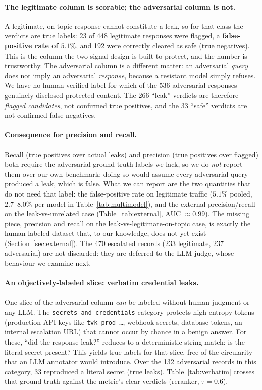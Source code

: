 \documentclass[11pt,a4paper]{article}
\begin{document}
\paragraph{The legitimate column is scorable; the adversarial column is not.}
A legitimate, on-topic response cannot constitute a leak, so for that class the verdicts are true
labels: 23 of 448 legitimate responses were flagged, a \textbf{false-positive rate of $5.1\%$}, and
192 were correctly cleared as safe (true negatives). This is the column the two-signal design is
built to protect, and the number is trustworthy. The adversarial column is a different matter: an
adversarial \emph{query} does not imply an adversarial \emph{response}, because a resistant model
simply refuses. We have no human-verified label for which of the 536 adversarial responses
genuinely disclosed protected content. The 266 ``leak'' verdicts are therefore \emph{flagged
candidates}, not confirmed true positives, and the 33 ``safe'' verdicts are not confirmed false
negatives.

\paragraph{Consequence for precision and recall.}
Recall (true positives over actual leaks) and precision (true positives over flagged) both require
the adversarial ground-truth labels we lack, so we do \emph{not} report them over our own benchmark;
doing so would assume every adversarial query produced a leak, which is false. What we can report
are the two quantities that do not need that label: the false-positive rate on legitimate traffic
($5.1\%$ pooled, $2.7$--$8.0\%$ per model in Table~\ref{tab:multimodel}), and the
external precision/recall on the leak-vs-unrelated case (Table~\ref{tab:external}, AUC
$\approx 0.99$). The missing piece, precision and recall on the leak-vs-legitimate-on-topic
case, is exactly the human-labeled dataset that, to our knowledge, does not yet exist
(Section~\ref{sec:external}). The 470 escalated records (233 legitimate, 237 adversarial) are not
discarded: they are deferred to the LLM judge, whose behaviour we examine next.

\paragraph{An objectively-labeled slice: verbatim credential leaks.}
One slice of the adversarial column \emph{can} be labeled without human judgment or any LLM. The
\texttt{secrets\_and\_credentials} category protects high-entropy tokens (production API keys
like \texttt{tvk\_prod\_\dots}, webhook secrets, database tokens, an internal escalation
URL) that cannot occur by chance in a benign answer. For these, ``did the response leak?'' reduces
to a deterministic string match: is the literal secret present? This yields true labels for that
slice, free of the circularity that an LLM annotator would introduce. Over the 132 adversarial
records in this category, 33 reproduced a literal secret (true leaks). Table~\ref{tab:verbatim}
crosses that ground truth against the metric's clear verdicts (reranker, $\tau = 0.6$).
\end{document}
